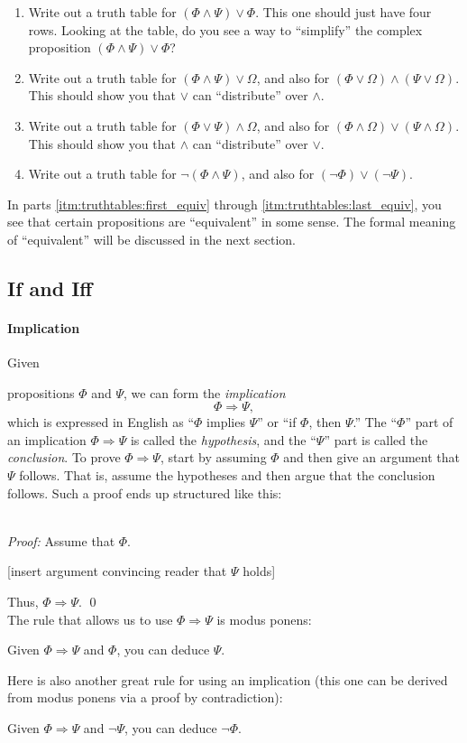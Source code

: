 \documentclass[12pt]{article}
\newcommand{\done}{\\\hspace*{0pt}\hfill$\blacksquare$}
\newcommand{\AND}{\wedge}
\newcommand{\OR}{\vee}
\newcommand{\ARR}{\Rightarrow}
\newcounter{rule}
\newcounter{theorem}
\def\putRuleNumber{\refstepcounter{rule}\therule}
\newcommand{\indented}[1]{\begin{adjustwidth}{1em}{}#1\end{adjustwidth}}
\def\thmcolonspace{\hspace{0.2em}}
\def\proofnewline{\\[0.75em]} %
\def\done{\qed\\[0em]} %
\newcommand{\thmbox}[1]{\fbox{\parbox{\textwidth}{{#1}}}}
\newcommand{\THMMOCK}[2]{\thmbox{\textbf{Theorem:} \thmcolonspace #1} \proofnewline \textit{Proof:} #2\done}
\newcommand{\RULE}[2]{\begin{tcolorbox}[title=Rule \putRuleNumber: #1,colbacktitle=white,coltitle=black,colback=white]#2\end{tcolorbox}}
\newcommand{\DRULE}[2]{\begin{tcolorbox}[title=Derived Rule \putRuleNumber: #1,colbacktitle=white,coltitle=black,colback=white]#2\end{tcolorbox}} %
\def\pA{\Phi}
\def\pB{\Psi}
\def\pC{\Omega}
\begin{document}
{\begin{enumerate}
\item
Write out a truth table for $(\pA\AND\pB)\OR\pA$. This one should just have four rows.
Looking at the table, do you see a way to ``simplify'' the complex proposition  $(\pA\AND\pB)\OR\pA$?

\item
Write out a truth table for $(\pA\AND\pB)\OR\pC$, and also for $(\pA\OR\pC)\AND(\pB\OR\pC)$.
This should show you that $\OR$ can ``distribute'' over $\AND$.

\item
Write out a truth table for $(\pA\OR\pB)\AND\pC$, and also for $(\pA\AND\pC)\OR(\pB\AND\pC)$.
This should show you that $\AND$ can ``distribute'' over $\OR$.

\item \label{itm:truthtables:last_equiv}
Write out a truth table for $\neg(\pA\AND\pB)$, and also for $(\neg\pA)\OR(\neg\pB)$.
\end{enumerate}
In parts \ref{itm:truthtables:first_equiv} through \ref{itm:truthtables:last_equiv},
you see that certain propositions are ``equivalent'' in some sense. The formal meaning of ``equivalent'' will be
discussed in the next section.
}


\subsection{If and Iff}

\paragraph{Implication}
\hypertarget{hl:ARR}{Given} propositions $\pA$ and $\pB$, we can form the \emph{implication}
$$
\pA\ARR\pB,
$$
which is expressed in English as ``$\pA$ implies $\pB$'' or ``if $\pA$, then $\pB$.''
The ``$\pA$'' part of an implication $\pA\ARR\pB$ is called the \emph{hypothesis},
and the ``$\pB$'' part is called the \emph{conclusion}.
\hypertarget{hl:ARRPV}{To} prove $\pA\ARR\pB$,
start by assuming $\pA$ and
then give an argument that $\pB$ follows.
That is, assume the hypotheses and then argue that the conclusion follows.
Such a proof ends up structured like this:

\THMMOCK{If $\pA$, then $\pB$.}{
Assume that $\pA$.
\indented{[insert argument convincing reader that $\pB$ holds]}
Thus, $\pA\ARR\pB$.
}

\hypertarget{hl:ARRUSE}{The} rule that allows us to use $\pA\ARR\pB$ is modus ponens:
\RULE{Modus Ponens\label{rule:mp}}{
Given $\pA\ARR\pB$ and $\pA$, you can deduce $\pB$.
}
Here is also another great rule for using an implication (this one can be derived from modus ponens via a proof by contradiction):
\DRULE{Modus Tollens}{
Given $\pA\ARR\pB$ and $\neg\pB$, you can deduce $\neg\pA$.
}
\end{document}
